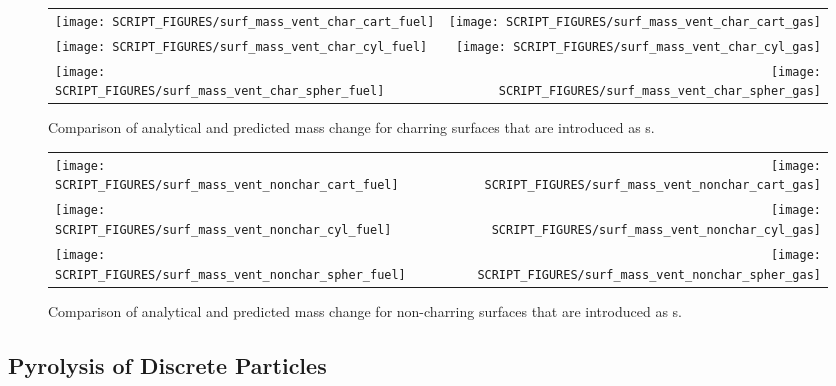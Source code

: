 \documentclass[11pt]{book}
\begin{document}
\begin{figure}[!htb]
\begin{tabular*}{\textwidth}{l@{\extracolsep{\fill}}r}
\texttt{[image: SCRIPT\_FIGURES/surf\_mass\_vent\_char\_cart\_fuel]} &
\texttt{[image: SCRIPT\_FIGURES/surf\_mass\_vent\_char\_cart\_gas]} \\
\texttt{[image: SCRIPT\_FIGURES/surf\_mass\_vent\_char\_cyl\_fuel]} &
\texttt{[image: SCRIPT\_FIGURES/surf\_mass\_vent\_char\_cyl\_gas]} \\
\texttt{[image: SCRIPT\_FIGURES/surf\_mass\_vent\_char\_spher\_fuel]} &
\texttt{[image: SCRIPT\_FIGURES/surf\_mass\_vent\_char\_spher\_gas]}
\end{tabular*}
\caption[The  test cases]{Comparison of analytical and predicted mass change for charring surfaces that are introduced as s.}
\label{surf_mass_vent_char}
\end{figure}

\begin{figure}[p]
\noindent
\begin{tabular*}{\textwidth}{l@{\extracolsep{\fill}}r}
\texttt{[image: SCRIPT\_FIGURES/surf\_mass\_vent\_nonchar\_cart\_fuel]} &
\texttt{[image: SCRIPT\_FIGURES/surf\_mass\_vent\_nonchar\_cart\_gas]} \\
\texttt{[image: SCRIPT\_FIGURES/surf\_mass\_vent\_nonchar\_cyl\_fuel]} &
\texttt{[image: SCRIPT\_FIGURES/surf\_mass\_vent\_nonchar\_cyl\_gas]} \\
\texttt{[image: SCRIPT\_FIGURES/surf\_mass\_vent\_nonchar\_spher\_fuel]} &
\texttt{[image: SCRIPT\_FIGURES/surf\_mass\_vent\_nonchar\_spher\_gas]}
\end{tabular*}
\caption[The  test cases]{Comparison of analytical and predicted mass change for non-charring surfaces that are introduced as s.}
\label{surf_mass_vent_nonchar}
\end{figure}

\clearpage

\subsection{Pyrolysis of Discrete Particles}

\label{surf_mass_part_char_cart_fuel}
\label{surf_mass_part_char_cart_gas}
\label{surf_mass_part_char_cyl_fuel}
\label{surf_mass_part_char_cyl_gas}
\label{surf_mass_part_char_spher_fuel}
\label{surf_mass_part_char_spher_gas}
\label{surf_mass_part_nonchar_cart_fuel}
\label{surf_mass_part_nonchar_cart_gas}
\label{surf_mass_part_nonchar_cyl_fuel}
\label{surf_mass_part_nonchar_cyl_gas}
\label{surf_mass_part_nonchar_spher_fuel}
\label{surf_mass_part_nonchar_spher_gas}
\end{document}
